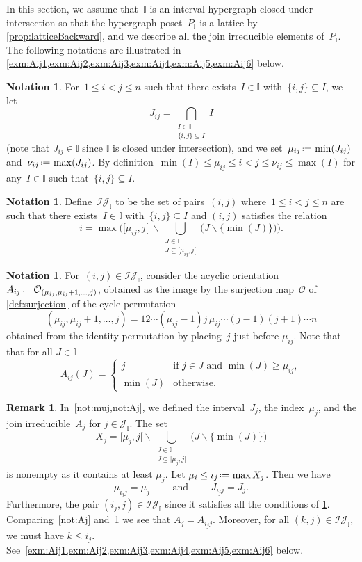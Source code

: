 \documentclass{amsart}
\theoremstyle{definition}
\newtheorem{remark}[theorem]{Remark}
\newtheorem{notation}[theorem]{Notation}
\newcommand{\cal}[1]{\mathcal{#1}} %
\newcommand{\ssm}{\smallsetminus} %
\newcommand{\eqdef}{\mbox{\,\raisebox{0.2ex}{\scriptsize\ensuremath{\mathrm:}}\ensuremath{=}\,}} %
\newcommand{\Or}{\mathcal O}  %
\newcommand{\II}{\mathbb I} %
\newcommand{\cJ}{\cal{J}} %
\newcommand{\cIJ}{\cal{IJ}} %
\begin{document}
In this section, we assume that~$\II$ is an interval hypergraph closed under intersection so that the hypergraph poset~$P_\II$ is a lattice  by \cref{prop:latticeBackward}, and we describe all the join irreducible elements of~$P_\II$.
The following notations are illustrated in \cref{exm:Aij1,exm:Aij2,exm:Aij3,exm:Aij4,exm:Aij5,exm:Aij6} below.

\begin{notation}
For~$1 \le i < j \le n$ such that there exists~$I \in \II$ with~$\{i,j\} \subseteq I$, we  let
\[
J_{ij} =  \bigcap_{\substack{I \in \II \\ \{i,j\}\subseteq I}}  I
\]
(note that $J_{ij} \in \II$ since $\II$ is closed under intersection), and we set~$\mu_{ij} \eqdef \min(J_{ij})$ and~$\nu_{ij} \eqdef \max(J_{ij})$.
By definition~$\min(I) \le \mu_{ij} \le i < j \le \nu_{ij} \le \max(I)$ for any~$I \in \II$ such that~$\{i,j\} \subseteq I$.
\end{notation}

\begin{notation}
\label{not:cIJ}
Define~$\cIJ_\II$ to be the set of pairs~$(i,j)$ where~$1 \le i < j \le n$ are such that there exists~$I \in \II$ with~$\{i,j\} \subseteq I$ and $(i,j)$ satisfies the relation
\[
i = \max \Big( {[\mu_{ij}, j[} \; \ssm \!\!\!\! \bigcup_{\substack{J \in \II \\ J \subseteq {[\mu_{ij}, j[}}} \!\!\!\!\big( J \ssm \{\min(J)\}\big) \Big).
\]
\end{notation}

\begin{notation}
\label{not:joinIrreducibles}
For~$(i,j) \in \cIJ_\II$, consider the acyclic orientation~$A_{ij} \eqdef \Or_{(\mu_{ij}, \mu_{ij}+1, \ldots, j)}$, obtained as the image by the surjection map~$\Or$ of \cref{def:surjection} of the cycle permutation
\[
(\mu_{ij}, \mu_{ij}+1, \dots, j) = 12 \cdots (\mu_{ij}-1)j\,\mu_{ij} \cdots (j-1) (j+1) \cdots n
\]
obtained from the identity permutation by placing~$j$ just before $\mu_{ij}$.
Note that that for all $J \in \II$
\[
A_{ij}(J) =
\begin{cases}
	j & \text{if } j \in J \text{ and } \min(J) \ge \mu_{ij},\\
	\min(J) & \text{otherwise.}
\end{cases}
\]
\end{notation}

\begin{remark}
In~\cref{not:muj,not:Aj}, we defined the interval~$J_j$, the index~$\mu_j$, and the join irreducible~$A_j$ for $j\in \cJ_\II$. The set 
\[
X_j={[\mu_{j}, j[} \ssm \!\!\!\! \bigcup_{\substack{J \in \II \\ J \subseteq {[\mu_{j}, j[}}} \!\!\!\!\big( J \ssm \{\min(J)\}\big)
\]
is nonempty as it contains at least $\mu_j$. Let $\mu_i \le i_j \eqdef \max X_j$. Then we have
\[
\mu_{i_jj}=\mu_j
\qquad\text{ and }\qquad
J_{i_jj}=J_j.
\]
Furthermore, the pair $(i_j,j)\in\cIJ_\II$ since it satisfies all the conditions of \cref{not:cIJ}.
Comparing~\cref{not:Aj} and~\cref{not:joinIrreducibles} we see that $A_j=A_{i_jj}$.
Moreover, for all $(k,j)\in \cIJ_\II$, we must have $k\le i_j$.
See~\cref{exm:Aij1,exm:Aij2,exm:Aij3,exm:Aij4,exm:Aij5,exm:Aij6} below.
\end{remark}
\end{document}
